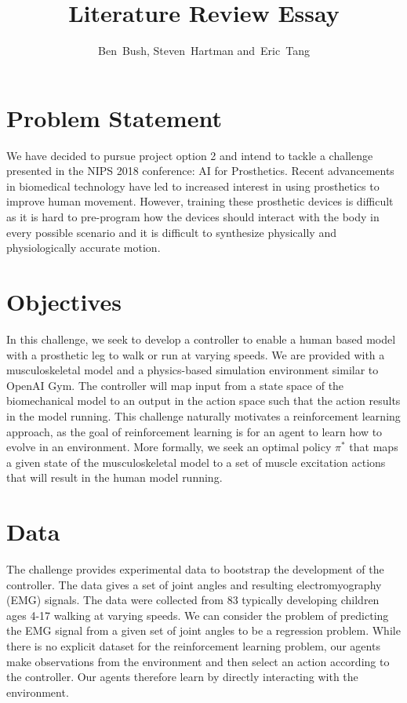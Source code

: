 \documentclass[journal,onecolumn]{IEEEtran}
\begin{document}
\title{Literature Review Essay}
\author{Ben~Bush,
        Steven~Hartman
        and~Eric~Tang%
        }
\maketitle               
\section{Problem Statement}
We have decided to pursue project option 2 and intend to tackle a challenge presented in the NIPS 2018 conference: AI for Prosthetics. Recent advancements in biomedical technology have led to increased interest in using prosthetics to improve human movement. However, training these prosthetic devices is difficult as it is hard to pre-program how the devices should interact with the body in every possible scenario and it is difficult to synthesize
physically and physiologically accurate motion.
\section{Objectives}
In this challenge, we seek to develop a controller to enable a human based model with a prosthetic leg to walk or run at varying speeds. We are provided with a musculoskeletal model and a physics-based simulation environment similar to OpenAI Gym. The controller will map
input from a state space of the biomechanical model to an output in the action space such that the action results in the model running. This challenge naturally motivates a reinforcement learning approach, as the goal of reinforcement learning is for an agent to learn how to evolve in an environment. More formally, we seek an optimal policy $\pi^{*}$ that maps a given state of the musculoskeletal model to a set of muscle excitation actions that will result in the human model
running. 
\section{Data}
The challenge provides experimental data to bootstrap the development of the controller. The data gives a set of joint angles and resulting electromyography (EMG) signals. The data were collected from 83 typically developing children ages 4-17 walking at varying speeds. We can consider the problem of predicting the EMG signal from a given set of joint angles to be a regression problem. While there is no explicit dataset for the reinforcement learning problem, our agents make observations from the environment and then select an action according to the controller. Our agents therefore learn by directly interacting with the environment. 
\end{document}
